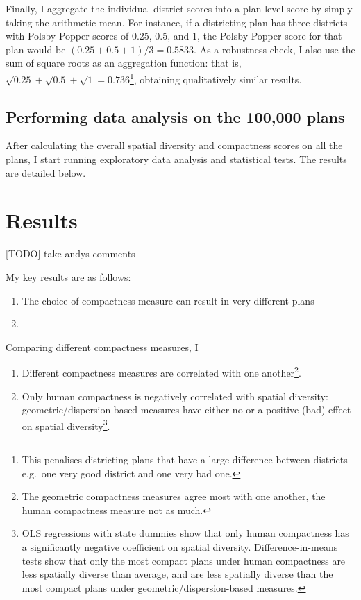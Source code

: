 \documentclass[]{article}
\providecommand{\tightlist}{%
  \setlength{\itemsep}{0pt}\setlength{\parskip}{0pt}}
\begin{document}
Finally, I aggregate the individual district scores into a plan-level
score by simply taking the arithmetic mean. For instance, if a
districting plan has three districts with Polsby-Popper scores of 0.25,
0.5, and 1, the Polsby-Popper score for that plan would be
\((0.25 + 0.5 + 1) / 3 = 0.5833\). As a robustness check, I also use the
sum of square roots as an aggregation function: that is,
\(\sqrt{0.25} + \sqrt{0.5} + \sqrt{1} = 0.736\)\footnote{This penalises
  districting plans that have a large difference between districts
  e.g.~one very good district and one very bad one.}, obtaining
qualitatively similar results.

\hypertarget{performing-data-analysis-on-the-100000-plans}{%
\subsection{Performing data analysis on the 100,000
plans}\label{performing-data-analysis-on-the-100000-plans}}

After calculating the overall spatial diversity and compactness scores
on all the plans, I start running exploratory data analysis and
statistical tests. The results are detailed below.

\hypertarget{results}{%
\section{Results}\label{results}}

{[}TODO{]} take andys comments

My key results are as follows:

\begin{enumerate}
\def\labelenumi{\arabic{enumi}.}
\item
  The choice of compactness measure can result in very different plans
\item
\end{enumerate}

Comparing different compactness measures, I

\begin{enumerate}
\def\labelenumi{\arabic{enumi}.}
\setcounter{enumi}{2}
\tightlist
\item
  Different compactness measures are correlated with one
  another\footnote{The geometric compactness measures agree most with
    one another, the human compactness measure not as much.}.
\item
  Only human compactness is negatively correlated with spatial
  diversity: geometric/dispersion-based measures have either no or a
  positive (bad) effect on spatial diversity\footnote{OLS regressions
    with state dummies show that only human compactness has a
    significantly negative coefficient on spatial diversity.
    Difference-in-means tests show that only the most compact plans
    under human compactness are less spatially diverse than average, and
    are less spatially diverse than the most compact plans under
    geometric/dispersion-based measures.}.
\end{enumerate}
\end{document}
